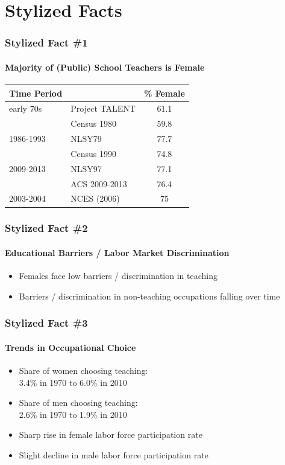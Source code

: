 \documentclass[11pt]{beamer}
\begin{document}
 \section{Stylized Facts}
	\begin{frame}
		\frametitle{Stylized Fact \#1}
		\framesubtitle{Majority of (Public) School Teachers is Female}
		\begin{table}[h!]
			\centering 
			\begin{tabular}{l l c }
				\toprule
				Time Period & & \% Female \\
				\midrule
                early 70s & Project TALENT  &  61.1 \\
                & Census 1980 &  59.8 \\
                1986-1993 & NLSY79  & 77.7   \\
                & Census 1990 & 74.8 \\
                2009-2013& NLSY97  & 77.1   \\
                & ACS 2009-2013  & 76.4  \\
				\midrule
				2003-2004 & NCES (2006) & 75\\
				\bottomrule
			\end{tabular}
		\end{table}
	\end{frame}
	
	\begin{frame}
		\frametitle{Stylized Fact \#2}
		\framesubtitle{Educational Barriers / Labor Market Discrimination}
		\begin{itemize}
			\item Females face low barriers / discrimination in teaching
			\item Barriers / discrimination in non-teaching occupations falling over time
		\end{itemize}
	\end{frame}
	
	\begin{frame}
		\frametitle{Stylized Fact \#3}
		\framesubtitle{Trends in Occupational Choice}
		\begin{itemize}
			\item Share of women choosing teaching: \\3.4\% in 1970 to 6.0\% in 2010
			\item Share of men choosing teaching: \\2.6\% in 1970 to 1.9\% in 2010
			\item Sharp rise in female labor force participation rate
			\item Slight decline in male labor force participation rate
		\end{itemize}
	\end{frame}
	
\end{document}
